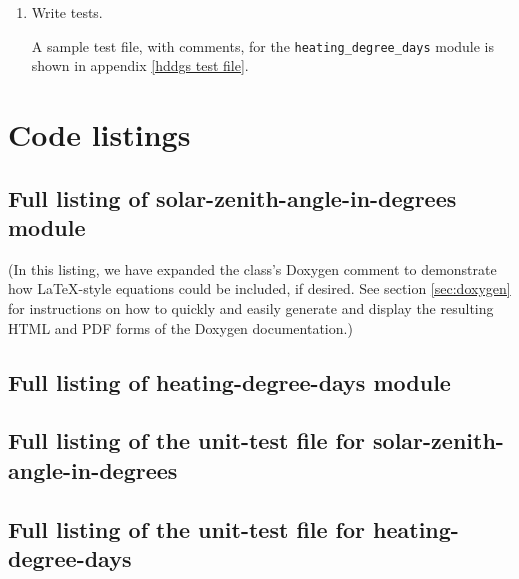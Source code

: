 \documentclass{article}\usepackage[]{graphicx}\usepackage[]{color}
\newcommand{\Rcode}[1]{\lstinline[style=Rstyle]{#1}}
\begin{document}
\begin{appendices}
\begin{enumerate}

\item Write tests.

  A sample test file, with comments, for the
  \Rcode{heating_degree_days} module is shown in appendix \ref{hddgs
  test file}.

\end{enumerate}


\section{Code listings}

\subsection{Full listing of solar-zenith-angle-in-degrees module} \label{sza module listing}

(In this listing, we have expanded the class's Doxygen comment to
demonstrate how LaTeX-style equations could be included, if desired.
See section \ref{sec:doxygen} for instructions on how to quickly and
easily generate and display the resulting HTML and PDF forms of the
Doxygen documentation.)



\subsection{Full listing of heating-degree-days module} \label{hdd module listing}



\subsection{Full listing of the unit-test file for solar-zenith-angle-in-degrees} \label{sza test file}



\subsection{Full listing of the unit-test file for heating-degree-days} \label{hdd test file}


\end{appendices}
\end{document}
